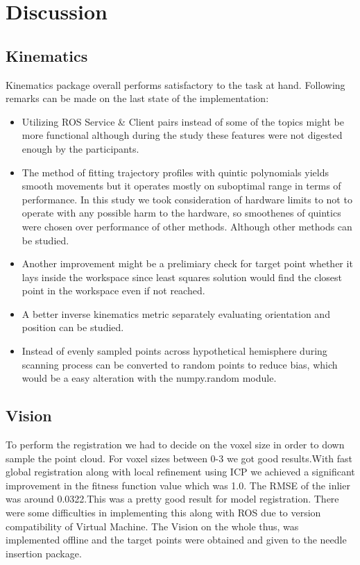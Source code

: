 \section{Discussion}
\subsection{Kinematics}
Kinematics package overall performs satisfactory to the task at hand. Following remarks can be made on the last state of the implementation:
\begin{itemize}
    \item  Utilizing ROS Service \& Client pairs instead of some of the topics might be more functional although during the study these features were not digested enough by the participants.
    \item  The method of fitting trajectory profiles with quintic polynomials yields smooth movements but it operates mostly on suboptimal range in terms of performance. In this study we took consideration of hardware limits to not to operate with any possible harm to the hardware, so smoothenes of quintics were chosen over performance of other methods. Although other methods can be studied.
    \item Another improvement might be a prelimiary check for target point whether it lays inside the workspace since least squares solution would find the closest point in the workspace even if not reached.
    \item A better inverse kinematics metric separately evaluating orientation and position can be studied.
    \item Instead of evenly sampled points across hypothetical hemisphere during scanning process can be converted to random points to reduce bias, which would be a easy alteration with the numpy.random module.
\end{itemize}    
\subsection{Vision}
To perform the registration we had to decide on the voxel size in order to down sample the point cloud. For voxel sizes between 0-3 we got good results.With fast global registration along with local refinement using ICP we achieved a significant improvement in the fitness function value which was 1.0. The RMSE of the inlier was around 0.0322.This was a pretty good result for model registration.
There were some difficulties in implementing this along with ROS due to version compatibility of Virtual Machine. The Vision on the whole thus, was implemented offline and the target points were obtained and given to the needle insertion package.
